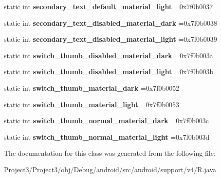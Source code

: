 \begin{DoxyCompactItemize}
\mbox{\label{classandroid_1_1support_1_1v4_1_1R_1_1color_a5ae796f839d6d0d757fecac2715db993}} 
static int {\bfseries secondary\+\_\+text\+\_\+default\+\_\+material\+\_\+light} =0x7f0b0037
\item 
\mbox{\label{classandroid_1_1support_1_1v4_1_1R_1_1color_a13d28bd8c160062f985c7896e73ef273}} 
static int {\bfseries secondary\+\_\+text\+\_\+disabled\+\_\+material\+\_\+dark} =0x7f0b0038
\item 
\mbox{\label{classandroid_1_1support_1_1v4_1_1R_1_1color_a698813eb09c5d363d9c09526873b08b6}} 
static int {\bfseries secondary\+\_\+text\+\_\+disabled\+\_\+material\+\_\+light} =0x7f0b0039
\item 
\mbox{\label{classandroid_1_1support_1_1v4_1_1R_1_1color_a17127929165503d7136b0dd966c4b66e}} 
static int {\bfseries switch\+\_\+thumb\+\_\+disabled\+\_\+material\+\_\+dark} =0x7f0b003a
\item 
\mbox{\label{classandroid_1_1support_1_1v4_1_1R_1_1color_a3e7964efee581e47b94e3f4a0ed7f062}} 
static int {\bfseries switch\+\_\+thumb\+\_\+disabled\+\_\+material\+\_\+light} =0x7f0b003b
\item 
\mbox{\label{classandroid_1_1support_1_1v4_1_1R_1_1color_af4c552b334c2c8b715c829a55c0d2aa9}} 
static int {\bfseries switch\+\_\+thumb\+\_\+material\+\_\+dark} =0x7f0b0052
\item 
\mbox{\label{classandroid_1_1support_1_1v4_1_1R_1_1color_a878ff97b7f3b6a99fc24c74466d78335}} 
static int {\bfseries switch\+\_\+thumb\+\_\+material\+\_\+light} =0x7f0b0053
\item 
\mbox{\label{classandroid_1_1support_1_1v4_1_1R_1_1color_a8f3557bc0d3b28ee45e6faa5a0518702}} 
static int {\bfseries switch\+\_\+thumb\+\_\+normal\+\_\+material\+\_\+dark} =0x7f0b003c
\item 
\mbox{\label{classandroid_1_1support_1_1v4_1_1R_1_1color_ad811adec5bd1afcceff31665aff6ed76}} 
static int {\bfseries switch\+\_\+thumb\+\_\+normal\+\_\+material\+\_\+light} =0x7f0b003d
\end{DoxyCompactItemize}


The documentation for this class was generated from the following file\+:\begin{DoxyCompactItemize}
\item 
Project3/\+Project3/obj/\+Debug/android/src/android/support/v4/R.\+java\end{DoxyCompactItemize}
